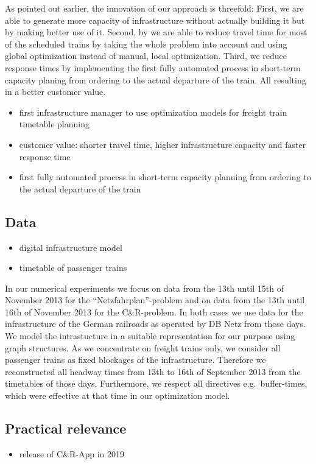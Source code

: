 As pointed out earlier, the innovation of our approach is threefold: First, we are able to generate more capacity of infrastructure without actually building it but by making better use of it. Second, by we are able to reduce travel time for most of the scheduled trains by taking the whole problem into account and using global optimization instead of manual, local optimization. Third, we reduce response times by implementing the first fully automated process in short-term capacity planing from ordering to the actual departure of the train. All resulting in a better customer value.

\begin{itemize}
  \item first infrastructure manager to use optimization models for freight train timetable planning
  \item customer value: shorter travel time, higher infrastructure capacity and faster response time
  \item first fully automated process in short-term capacity planning from ordering to the actual departure of the train
\end{itemize}

\subsection{Data}
\begin{itemize}
  \item digital infrastructure model
  \item timetable of passenger trains
\end{itemize}
In our numerical experiments we focus on data from the 13th until 15th of November 2013 for the ``Netzfahrplan''-problem and on data from the 13th until 16th of November 2013 for the C\&R-problem. In both cases we use data for the infrastructure of the German railroads as operated by DB Netz from those days. We model the intrastucture in a suitable representation for our purpose using graph structures. As we concentrate on freight trains only, we consider all passenger trains as fixed blockages of the infrastructure. Therefore we reconstructed all headway times from 13th to 16th of September 2013 from the timetables of those days. Furthermore, we respect all directives e.g.\ buffer-times, which were effective at that time in our optimization model.

\subsection{Practical relevance}
\begin{itemize}
  \item release of C\&R-App in 2019 \\
\end{itemize}


